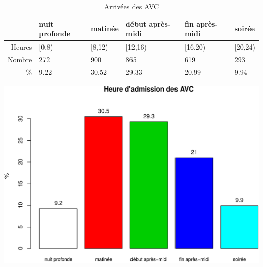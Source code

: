 \documentclass[]{article}
\begin{document}
\begin{table}[ht]
\centering
\begin{tabular}{rlllll}
  \hline
 & nuit profonde & matinée & début après-midi & fin après-midi & soirée \\ 
  \hline
Heures & [0,8) & [8,12) & [12,16) & [16,20) & [20,24) \\ 
  Nombre & 272 & 900 & 865 & 619 & 293 \\ 
  \% & 9.22 & 30.52 & 29.33 & 20.99 & 9.94 \\ 
   \hline
\end{tabular}
\caption{Arrivées des AVC} 
\label{avc.arrive}
\end{table}

\includegraphics{rapport2014_V4_files/figure-latex/avc_periode-1.pdf}
\end{document}
